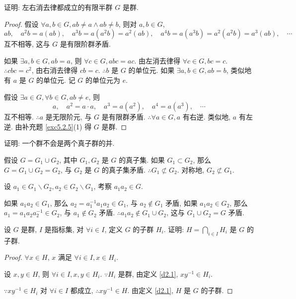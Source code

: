 \documentclass[color=black,device=normal,lang=cn,mode=geye]{elegantnote}
\begin{document}
\begin{exercisec}[5.2.10(2)]
    证明: 左右消去律都成立的有限半群 $G$ 是群.
\end{exercisec}
\begin{proof}
    假设 $\forall a,b\in G,ab\neq a\wedge ab\neq b$, 则对 $a,b\in G$,
    \[ab,\quad a^2b=a(ab),\quad a^3b=a(a^2b)=a^2(ab),\quad a^4b=a(a^3b)=a^2(a^2b)=a^3(ab),\quad\cdots\]
    互不相等, 这与 $G$ 是有限阶群矛盾.
    
    如果 $\exists a,b\in G,ab=a$, 则 $\forall c\in G,abc=ac$. 由左消去律得 $\forall c\in G,bc=c$. $\therefore cbc=c^2$, 由右消去律得 $cb=c$. $\therefore b$ 是 $G$ 的单位元. 如果 $\exists a,b\in G,ab=b$, 类似地有 $a$ 是 $G$ 的单位元. 记 $G$ 的单位元为 $e$.

    假设 $\exists a\in G,\forall b\in G,ab\neq e$, 则
    \[a,\quad a^2=a\cdot a,\quad a^3=a(a^2),\quad a^4=a(a^3),\quad\cdots\]
    互不相等. $\therefore a$ 是无限阶元, 与 $G$ 是有限群矛盾. $\therefore\forall a\in G,a$ 有右逆. 类似地, $a$ 有左逆. 由补充题 \ref{exc5.2.5}(1) 得 $G$ 是群.
\end{proof}
\begin{exercisec}[5.2.12]
    证明: 一个群不会是两个真子群的并.
\end{exercisec}
\begin{solution}
    假设 $G=G_1\cup G_2$, 其中 $G_1,G_2$ 是 $G$ 的真子集. 如果 $G_1\subset G_2$, 那么 $G=G_1\cup G_2=G_2$, 与 $G_2$ 是 $G$ 的真子集矛盾. $\therefore G_1\not\subset G_2$. 对称地, $G_2\not\subset G_1$.

    设 $a_1\in G_1\backslash G_2,a_2\in G_2\backslash G_1$, 考察 $a_1a_2\in G$.
    
    如果 $a_1a_2\in G_1$, 那么 $a_2=a_1^{-1}a_1a_2\in G_1$, 与 $a_2\notin G_1$ 矛盾, 如果 $a_1a_2\in G_2$, 那么 $a_1=a_1a_2a_2^{-1}\in G_2$, 与 $a_1\notin G_2$ 矛盾. $\therefore a_1a_2\notin G_1\cup G_2$, 这与 $G_1\cup G_2=G$ 矛盾.
\end{solution}
\begin{exercisec}[5.2.13]
    设 $G$ 是群, $I$ 是指标集, 对 $\forall i\in I$, 定义 $G$ 的子群 $H_i$. 证明: $H=\bigcap\limits_{i\in I}H_i$ 是 $G$ 的子群.
\end{exercisec}
\begin{proof}
    $\forall x\in H$, $x$ 满足 $\forall i\in I,x\in H_i$.

    设 $x,y\in H$, 则 $\forall i\in I,x,y\in H_i$. $\because H_i$ 是群, 由定义 \ref{d2.1}, $xy^{-1}\in H_i$.
    
    $\because xy^{-1}\in H_i$ 对 $\forall i\in I$ 都成立, $\therefore xy^{-1}\in H$. 由定义 \ref{d2.1}, $H$ 是 $G$ 的子群.
\end{proof}
\end{document}

